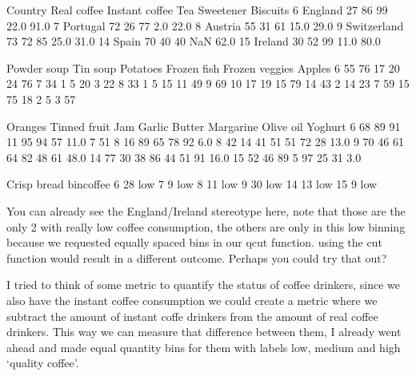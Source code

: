 \documentclass[letterpaper,10pt,english]{jupyterBook}
\begin{document}
\begin{sphinxVerbatim}[commandchars=\\\{\}]
        Country  Real coffee  Instant coffee  Tea  Sweetener  Biscuits  \PYGZbs{}
6       England           27              86   99       22.0      91.0   
7      Portugal           72              26   77        2.0      22.0   
8       Austria           55              31   61       15.0      29.0   
9   Switzerland           73              72   85       25.0      31.0   
14        Spain           70              40   40        NaN      62.0   
15      Ireland           30              52   99       11.0      80.0   

    Powder soup  Tin soup  Potatoes  Frozen fish  Frozen veggies  Apples  \PYGZbs{}
6            55        76        17           20              24      76   
7            34         1         5           20               3      22   
8            33         1         5           15              11      49   
9            69        10        17           19              15      79   
14           43         2        14           23               7      59   
15           75        18         2            5               3      57   

    Oranges  Tinned fruit  Jam  Garlic  Butter  Margarine  Olive oil  Yoghurt  \PYGZbs{}
6        68            89   91      11      95         94         57     11.0   
7        51             8   16      89      65         78         92      6.0   
8        42            14   41      51      51         72         28     13.0   
9        70            46   61      64      82         48         61     48.0   
14       77            30   38      86      44         51         91     16.0   
15       52            46   89       5      97         25         31      3.0   

    Crisp bread bin\PYGZus{}coffee  
6            28        low  
7             9        low  
8            11        low  
9            30        low  
14           13        low  
15            9        low  
\end{sphinxVerbatim}

\sphinxAtStartPar
You can already see the England/Ireland stereotype here, note that those are the only 2 with really low coffee consumption, the others are only in this low binning because we requested equally spaced bins in our qcut function. using the cut function would result in a different outcome.
Perhaps you could try that out?

\sphinxAtStartPar
I tried to think of some metric to quantify the status of coffee drinkers, since we also have the instant coffee consumption we could create a metric where we subtract the amount of instant coffe drinkers from the amount of real coffee drinkers.
This way we can measure that difference between them, I already went ahead and made equal quantity bins for them with labels low, medium and high ‘quality coffee’.
\end{document}
